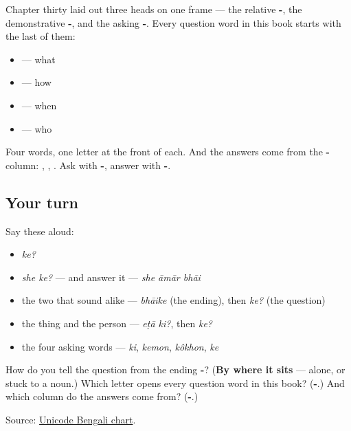 \begin{grammarlens}[title={Grammar Lens: the asking head, for the third time}]
Chapter thirty laid out three heads on one frame — the relative \textbf{-}, the demonstrative \textbf{-}, and the asking \textbf{-}. Every question word in this book starts with the last of them:

\begin{itemize}
\raggedright
  \item \textbf{} — what
  \item \textbf{} — how
  \item \textbf{} — when
  \item \textbf{} — who
\end{itemize}

Four words, one letter at the front of each. And the answers come from the \textbf{-} column: \textbf{}, \textbf{}, \textbf{}. Ask with \textbf{-}, answer with \textbf{-}.
\end{grammarlens}

\subsection*{Your turn}
Say these aloud:

\begin{itemize}
\raggedright
  \item \emph{ke?}
  \item \emph{she ke?} — and answer it — \emph{she āmār bhāi}
  \item the two that sound alike — \emph{bhāike} (the ending), then \emph{ke?} (the question)
  \item the thing and the person — \emph{eṭā ki?}, then \emph{ke?}
  \item the four asking words — \emph{ki}, \emph{kemon}, \emph{kôkhon}, \emph{ke}
\end{itemize}

\begin{tcolorbox}[breakable,colback=teal!4,colframe=teal!35!black,title={Before you move on}]
How do you tell the question \textbf{} from the ending \textbf{-}? (\textbf{By where it sits} — alone, or stuck to a noun.) Which letter opens every question word in this book? (\textbf{-}.) And which column do the answers come from? (\textbf{-}.)

Source: \href{https://www.unicode.org/charts/PDF/U0980.pdf}{Unicode Bengali chart}.
\end{tcolorbox}

